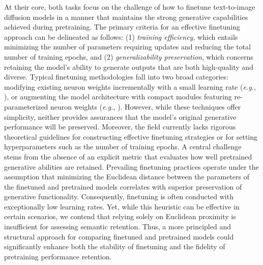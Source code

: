 At their core, both tasks focus on the challenge of how to finetune text-to-image diffusion models in a manner that maintains the strong generative capabilities achieved during pretraining. The primary criteria for an effective finetuning approach can be delineated as follows: (1) \emph{training efficiency}, which entails minimizing the number of parameters requiring updates and reducing the total number of training epochs, and (2) \emph{generalizability preservation}, which concerns retaining the model’s ability to generate outputs that are both high-quality and diverse. Typical finetuning methodologies fall into two broad categories: modifying existing neuron weights incrementally with a small learning rate (\emph{e.g.}, \cite{ruiz2023dreambooth}), or augmenting the model architecture with compact modules featuring re-parameterized neuron weights (\emph{e.g.}, \cite{hulora2022,zhang2023adding}). However, while these techniques offer simplicity, neither provides assurances that the model’s original generative performance will be preserved. Moreover, the field currently lacks rigorous theoretical guidelines for constructing effective finetuning strategies or for setting hyperparameters such as the number of training epochs. A central challenge stems from the absence of an explicit metric that evaluates how well pretrained generative abilities are retained. Prevailing finetuning practices operate under the assumption that minimizing the Euclidean distance between the parameters of the finetuned and pretrained models correlates with superior preservation of generative functionality. Consequently, finetuning is often conducted with exceptionally low learning rates. Yet, while this heuristic can be effective in certain scenarios, we contend that relying solely on Euclidean proximity is insufficient for assessing semantic retention. Thus, a more principled and structural approach for comparing finetuned and pretrained models could significantly enhance both the stability of finetuning and the fidelity of pretraining performance retention.

